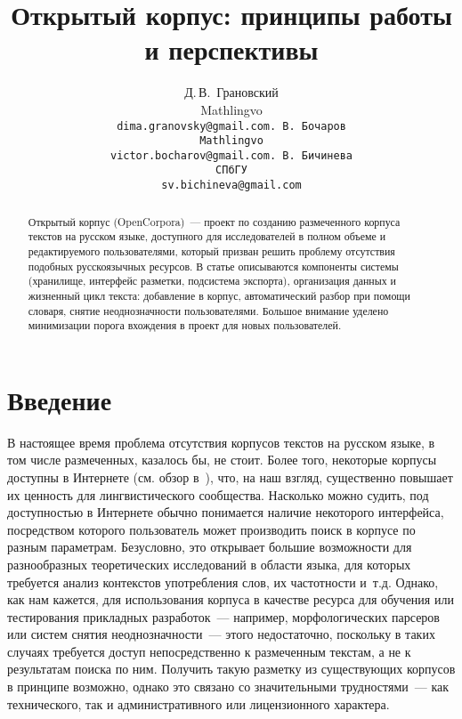 \documentclass[a4paper]{article}
\begin{document}
\author{Д.\,В.~Грановский\\\small Mathlingvo\\\small\tt dima.granovsky@gmail.com.\,В.~Бочаров\\\small Mathlingvo\\\small\tt victor.bocharov@gmail.com.\,В.~Бичинева\\\small СПбГУ\\\small\tt sv.bichineva@gmail.com}
\title{Открытый корпус: принципы работы и перспективы}
\date{}
\maketitle
\begin{abstract}
Открытый корпус (OpenCorpora)~--- проект по созданию размеченного корпуса текстов на русском языке, доступного для исследователей в полном объеме и редактируемого пользователями, который призван решить проблему отсутствия подобных русскоязычных ресурсов. В статье описываются компоненты системы (хранилище, интерфейс разметки, подсистема экспорта), организация данных и жизненный цикл текста: добавление в корпус, автоматический разбор при помощи словаря, снятие неоднозначности пользователями. Большое внимание уделено минимизации порога вхождения в проект для новых пользователей.
\end{abstract}
\section{Введение}
В настоящее время проблема отсутствия корпусов текстов на русском языке, в том числе размеченных, казалось бы, не стоит. Более того, некоторые корпусы доступны в Интернете (см. обзор в~\cite{reznikova05}), что, на наш взгляд, существенно повышает их ценность для лингвистического сообщества. Насколько можно судить, под доступностью в Интернете обычно понимается наличие некоторого интерфейса, посредством которого пользователь может производить поиск в корпусе по разным параметрам. Безусловно, это открывает большие возможности для разнообразных теоретических исследований в области языка, для которых требуется анализ контекстов употребления слов, их частотности и~т.д. Однако, как нам кажется, для использования корпуса в качестве ресурса для обучения или тестирования прикладных разработок~--- например, морфологических парсеров или систем снятия неоднозначности~--- этого недостаточно, поскольку в таких случаях требуется доступ непосредственно к размеченным текстам, а не к результатам поиска по ним. Получить такую разметку из существующих корпусов в принципе возможно, однако это связано со значительными трудностями~--- как технического, так и административного или лицензионного характера.
\end{document}
